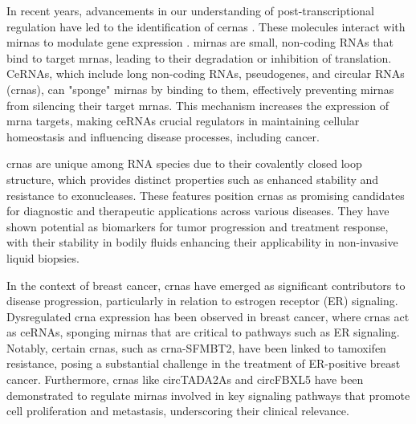 In recent years, advancements in our understanding of post-transcriptional
regulation have led to the identification of \gls{cerna}s
\supercite{salmena_cerna_2011,tay_multilayered_2014}.
These molecules interact with \gls{mirna}s to modulate gene expression
\supercite{salmena_cerna_2011,li_long_2017}.
\gls{mirna}s are small, non-coding RNAs that bind to target \gls{mrna}s,
leading to their degradation or inhibition of
translation\supercite{salmena_cerna_2011,tay_multilayered_2014}.
CeRNAs, which include long non-coding RNAs, pseudogenes, and circular RNAs
(\gls{crna}s), can "sponge" \gls{mirna}s by binding to them, effectively
preventing \gls{mirna}s from silencing their target
\gls{mrna}s\supercite{salmena_cerna_2011,poliseno_coding-independent_2010}.
This mechanism increases the expression of \gls{mrna} targets, making ceRNAs
crucial regulators in maintaining cellular homeostasis and influencing disease
processes, including cancer\supercite{salmena_cerna_2011,vo_landscape_2019}.

\Gls{crna}s are unique among RNA species due to their covalently closed loop
structure, which provides distinct properties such as enhanced stability and
resistance to exonucleases\supercite{vo_landscape_2019}.
These features position \gls{crna}s as promising candidates for diagnostic and
therapeutic applications across various
diseases\supercite{ma_circular_2020,hoque_exploring_2023,wilusz_circular_2017}.
They have shown potential as biomarkers for tumor progression and treatment
response\supercite{bao_prognostic_2020,ren_construction_2017}, with their
stability in bodily fluids enhancing their applicability in non-invasive liquid
biopsies\supercite{bao_prognostic_2020,zhang_circular_2018}.

In the context of breast cancer, \gls{crna}s have emerged as significant
contributors to disease progression, particularly in relation to estrogen
receptor (ER) signaling.
Dysregulated \gls{crna} expression has been observed in breast cancer, where
\gls{crna}s act as ceRNAs, sponging \gls{mirna}s that are critical to pathways
such as ER signaling\supercite{nair_circular_2016,xu_circrna_2022}.
Notably, certain \gls{crna}s, such as \gls{crna}-SFMBT2, have been linked to
tamoxifen resistance, posing a substantial challenge in the treatment of
ER-positive breast cancer\supercite{li_circrna-sfmbt2_2023}.
Furthermore, \gls{crna}s like circTADA2As and circFBXL5 have been demonstrated
to regulate \gls{mirna}s involved in key signaling pathways that promote cell
proliferation and metastasis, underscoring their clinical
relevance\supercite{xu_circtada2as_2019,gao_hsa_circrna_0006528_2019}.

